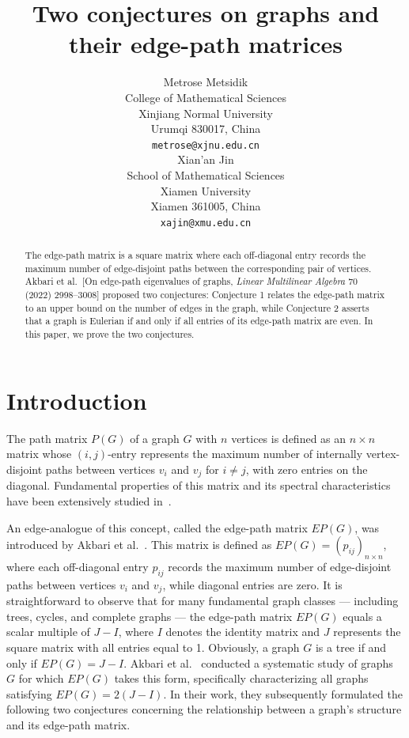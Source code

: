 \documentclass{article}
\title{Two conjectures on graphs and their edge-path matrices}
\author{
 Metrose Metsidik \\
  College of Mathematical Sciences\\
  Xinjiang Normal University\\
  Urumqi 830017, China \\
  \texttt{metrose@xjnu.edu.cn} \\
   \And
 Xian'an Jin \\
  School of Mathematical Sciences\\
  Xiamen University\\
  Xiamen 361005, China \\
  \texttt{xajin@xmu.edu.cn} \\
}
\begin{document}
\maketitle
\begin{abstract}
The edge-path matrix is a square matrix where each off-diagonal entry records the maximum number of edge-disjoint paths between the corresponding pair of vertices. Akbari et al.~[On edge-path eigenvalues of graphs, {\it Linear Multilinear Algebra} 70 (2022) 2998–3008] proposed two conjectures: Conjecture 1 relates the edge-path matrix to an upper bound on the number of edges in the graph, while Conjecture 2 asserts that a graph is Eulerian if and only if all entries of its edge-path matrix are even. In this paper, we prove the two conjectures.
\end{abstract}
\section{Introduction}

The path matrix \( P(G) \) of a graph \( G \) with \( n \) vertices is defined as an \( n \times n \) matrix whose \((i,j)\)-entry represents the maximum number of internally vertex-disjoint paths between vertices \( v_i \) and \( v_j \) for \( i \neq j \), with zero entries on the diagonal. Fundamental properties of this matrix and its spectral characteristics have been extensively studied in~\cite{Akbari1,Patekar,Shikare}.

An edge-analogue of this concept, called the edge-path matrix \( EP(G) \), was introduced by Akbari et al.~\cite{Akbari}. This matrix is defined as \( EP(G) = (p_{ij})_{n \times n} \), where each off-diagonal entry \( p_{ij} \) records the maximum number of edge-disjoint paths between vertices \( v_i \) and \( v_j \), while diagonal entries are zero. It is straightforward to observe that for many fundamental graph classes — including trees, cycles, and complete graphs — the edge-path matrix \( EP(G) \) equals a scalar multiple of \( J - I \), where $I$ denotes the identity matrix and $J$  represents the square matrix with all entries equal to 1. Obviously, a graph \( G \) is a tree if and only if \( EP(G) = J - I \). Akbari et al.~\cite{Akbari} conducted a systematic study of graphs \( G \) for which \( EP(G) \) takes this form, specifically characterizing all graphs satisfying \( EP(G) = 2(J - I) \). In their work, they subsequently formulated the following two conjectures concerning the relationship between a graph's structure and its edge-path matrix.
\end{document}
